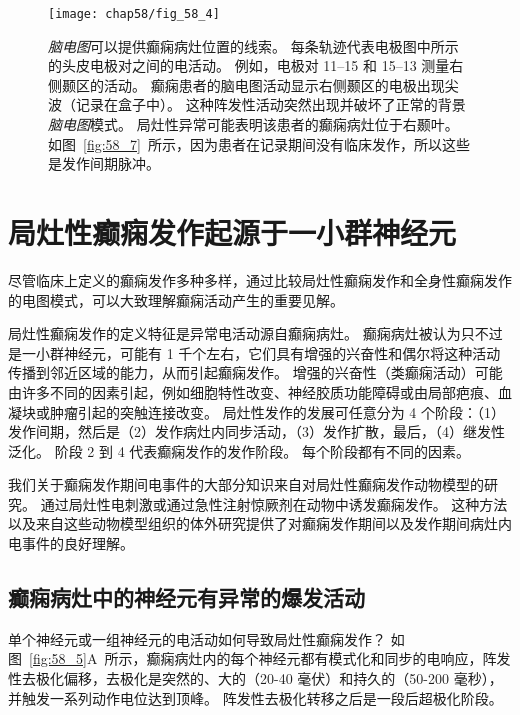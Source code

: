 \begin{figure}[htbp]
	\centering
	\texttt{[image: chap58/fig\_58\_4]}
	\caption{\textit{脑电图}可以提供癫痫病灶位置的线索。
		每条轨迹代表电极图中所示的头皮电极对之间的电活动。
		例如，电极对 11–15 和 15–13 测量右侧颞区的活动。
		癫痫患者的脑电图活动显示右侧颞区的电极出现尖波（记录在盒子中）。
		这种阵发性活动突然出现并破坏了正常的背景\textit{脑电图}模式。
		局灶性异常可能表明该患者的癫痫病灶位于右颞叶。
		如图~\ref{fig:58_7}~所示，因为患者在记录期间没有临床发作，所以这些是发作间期脉冲\cite{lothman1990seizures}。}
	\label{fig:58_4}
\end{figure}



\section{局灶性癫痫发作起源于一小群神经元}

尽管临床上定义的癫痫发作多种多样，通过比较局灶性癫痫发作和全身性癫痫发作的电图模式，可以大致理解癫痫活动产生的重要见解。


局灶性癫痫发作的定义特征是异常电活动源自癫痫病灶。
癫痫病灶被认为只不过是一小群神经元，可能有 1 千个左右，它们具有增强的兴奋性和偶尔将这种活动传播到邻近区域的能力，从而引起癫痫发作。
增强的兴奋性（类癫痫活动）可能由许多不同的因素引起，例如细胞特性改变、神经胶质功能障碍或由局部疤痕、血凝块或肿瘤引起的突触连接改变。
局灶性发作的发展可任意分为 4 个阶段：（1）发作间期，然后是（2）发作病灶内同步活动，（3）发作扩散，最后，（4）继发性泛化。
阶段 2 到 4 代表癫痫发作的发作阶段。
每个阶段都有不同的因素。


我们关于癫痫发作期间电事件的大部分知识来自对局灶性癫痫发作动物模型的研究。
通过局灶性电刺激或通过急性注射惊厥剂在动物中诱发癫痫发作。
这种方法以及来自这些动物模型组织的体外研究提供了对癫痫发作期间以及发作期间病灶内电事件的良好理解。



\subsection{癫痫病灶中的神经元有异常的爆发活动}

单个神经元或一组神经元的电活动如何导致局灶性癫痫发作？
如图~\ref{fig:58_5}A~所示，癫痫病灶内的每个神经元都有模式化和同步的电响应，阵发性去极化偏移，去极化是突然的、大的（20-40 毫伏）和持久的（50-200 毫秒），并触发一系列动作电位达到顶峰。
阵发性去极化转移之后是一段后超极化阶段。


